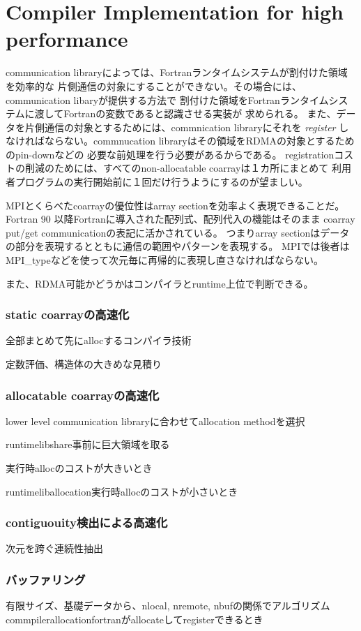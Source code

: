 \section{Compiler Implementation for high performance}\label{sec:compiler}

communication libraryによっては、Fortranランタイムシステムが割付けた領域を効率的な
片側通信の対象にすることができない。その場合には、communication libaryが提供する方法で
割付けた領域をFortranランタイムシステムに渡してFortranの変数であると認識させる実装が
求められる。
また、データを片側通信の対象とするためには、commnication libraryにそれを {\em register}
しなければならない。commnucation libraryはその領域をRDMAの対象とするためのpin-downなどの
必要な前処理を行う必要があるからである。
registrationコストの削減のためには、すべてのnon-allocatable coarrayは１カ所にまとめて
利用者プログラムの実行開始前に１回だけ行うようにするのが望ましい。






MPIとくらべたcoarrayの優位性はarray sectionを効率よく表現できることだ。
Fortran 90 以降Fortranに導入された配列式、配列代入の機能はそのまま
coarray put/get communicationの表記に活かされている。
つまりarray sectionはデータの部分を表現するとともに通信の範囲やパターンを表現する。
MPIでは後者はMPI\_typeなどを使って次元毎に再帰的に表現し直さなければならない。

また、RDMA可能かどうかはコンパイラとruntime上位で判断できる。



\subsubsection{static coarrayの高速化}

全部まとめて先にallocするコンパイラ技術

定数評価、構造体の大きめな見積り

\subsubsection{allocatable coarrayの高速化}

lower level communication libraryに合わせてallocation methodを選択

runtimelibshare事前に巨大領域を取る

実行時allocのコストが大きいとき


runtimeliballocation実行時allocのコストが小さいとき

\subsubsection{contiguouity検出による高速化}
次元を跨ぐ連続性抽出

\subsubsection{バッファリング}
有限サイズ、基礎データから、nlocal, nremote, nbufの関係でアルゴリズム
commpilerallocationfortranがallocateしてregisterできるとき



